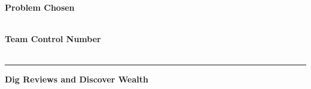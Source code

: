 \documentclass[../mcmpaper]{subfiles}
\begin{document}
	\thispagestyle{empty}
	\begingroup
	\setlength{\parindent}{0pt}
	\begin{minipage}[t]{0.33\linewidth}
		\bfseries\centering%
		Problem Chosen\\[0.7pc]
		{\Huge\textbf{\problem}}\\[2.8pc]
	\end{minipage}%
	\begin{minipage}[t]{0.33\linewidth}
		\centering%
		\textbf{\headset}%
	\end{minipage}%
	\begin{minipage}[t]{0.33\linewidth}
		\centering\bfseries%
		Team Control Number\\[0.7pc]
		{\Huge\textbf{\MCMcontrol}}\\[2.8pc]
	\end{minipage}\par
	\rule{\linewidth}{0.8pt}\par
	\par
	\endgroup
    \medskip
    \centerline{\bfseries\Large Dig Reviews and Discover Wealth}
    \vspace*{-1em}
	\begin{abstract}
    
	\end{abstract}
\end{document}

